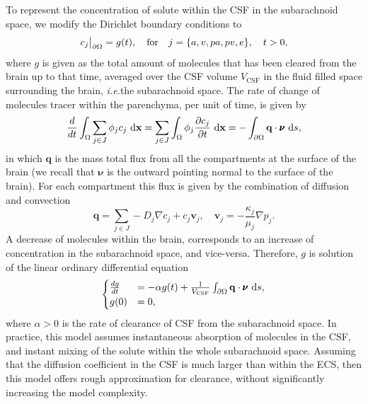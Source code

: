 \documentclass[10pt,letterpaper]{article}
\newcommand\restr[2]{{%
\left.\kern-\nulldelimiterspace %
#1 %
\vphantom{\big|} %
\right|_{#2} %
}}
\newcommand{\ie}{\emph{i.e.}\;}
\newcommand{\1}{^{(1)}}
\newcommand{\2}{^{(2)}}
\newcommand*{\dd}{\mathop{\kern0pt\mathrm{d}}\!{}}
\newcommand {\x}   {\mathbf{x}}
\begin{document}
To represent the concentration of solute within the CSF in the subarachnoid space, we modify the Dirichlet boundary conditions to
\begin{equation}
     \restr{c_j}{\partial \Omega} =  g(t),\quad \text{for}\quad j=\{a,v,pa,pv,e \}, \quad t >0,
    \label{eq:inulin-inhomogeneous-dirichlet}
\end{equation}
where $ g $ is given as the total amount of molecules that has been cleared from the brain up to that time, averaged over the CSF volume $ V_\text{CSF} $ in the fluid filled space surrounding the brain, \ie the subarachnoid space. The rate of change of molecules tracer within the parenchyma, per unit of time, is given by
\begin{equation}
    \frac{d}{dt}\int_{\Omega} \sum_{j\in J} \phi_j c_j \,\dd \x= \sum_{j\in J} \int_{\Omega} \phi_j \frac{\partial c_j}{\partial t} \,\dd \x=   - \int_{\partial \Omega}  \mathbf{q} \cdot \pmb{\nu} \,\dd s  ,
\end{equation}
in which $\mathbf{q}$ is the mass total flux from all the compartments at the surface of the brain (we recall that $\pmb{\nu}$ is the outward pointing normal to the surface of the brain). 
For each compartment this flux is given by the combination of diffusion and convection 
\[
    \mathbf{q} =  \sum_{j\in J}  - D_j\nabla c_j + c_j \mathbf{v}_j,\quad \mathbf{v}_j = -\frac{\kappa_j}{\mu_j}\nabla p_j.   
\]
A decrease of molecules within the brain, corresponds to an increase of concentration in the subarachnoid space, and vice-versa. Therefore, $g$ is solution of the linear ordinary differential equation 
\begin{equation}
    \begin{cases}
        \frac{dg}{dt} &= - \alpha g(t)  + \frac{1}{V_\text{CSF}} \int_{\partial \Omega}  \mathbf{q} \cdot\pmb{\nu}\,\dd s,\\
        g(0) &= 0,
    \end{cases}
    \label{eq:inulin-boundary-inhomogeneous}
\end{equation}
where $\alpha > 0$ is the rate of clearance of CSF from the subarachnoid space. 
In practice, this model assumes instantaneous absorption of molecules in the CSF, and instant mixing of the solute within the whole subarachnoid space. Assuming that the diffusion coefficient in the CSF is much larger than within the ECS, then this model offers rough approximation for clearance, without significantly increasing the model complexity.
\end{document}
